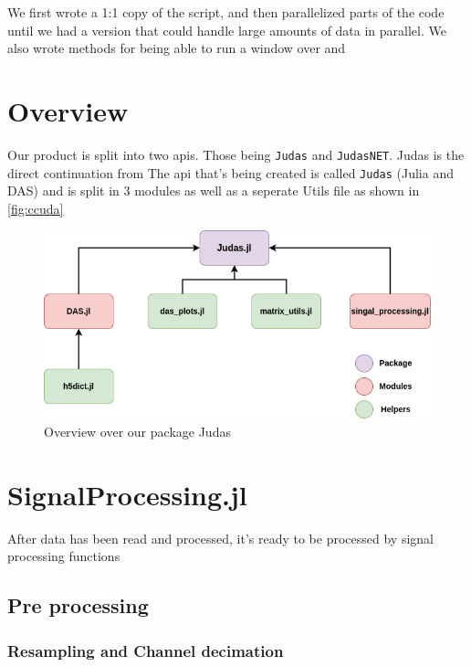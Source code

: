 We first wrote a 1:1 copy of the script, and then parallelized parts of the code until we had a version that could handle large amounts of data in parallel. We also wrote methods for being able to run a window over and \\ 


\section{Overview}

Our product is split into two apis. Those being \texttt{Judas} and \texttt{JudasNET}. Judas is the direct continuation from \cite{projthesis}
The \acrshort{api} that's being created is called \texttt{Judas} (Julia and DAS) and is split in 3 modules as well as a seperate Utils file as shown in \ref{fig:ccuda}

\begin{figure}[h]
    \centering
    \includegraphics[scale=.6]{figures/judas_overview.png}
    \caption{Overview over our package Judas}
    \label{fig:judasoverview}
\end{figure}



\section{SignalProcessing.jl}

After data has been read and processed, it's ready to be processed by signal processing functions 


\subsection{Pre processing}

\subsubsection{Resampling and Channel decimation}

